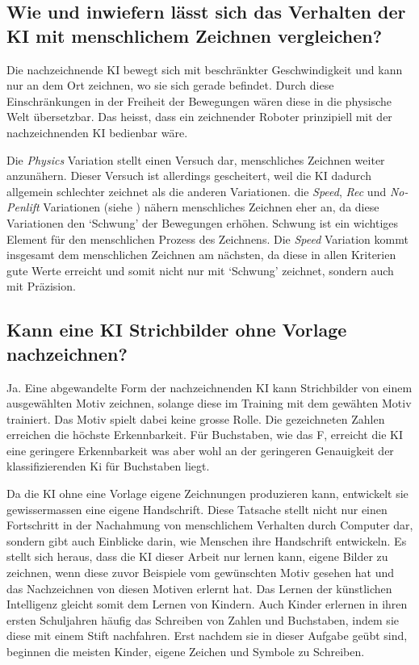   

\subsection{Wie und inwiefern lässt sich das Verhalten der KI mit menschlichem Zeichnen vergleichen?}\label{subsub:d_frage_unter_5}

Die nachzeichnende KI bewegt sich mit beschränkter Geschwindigkeit und kann nur
an dem Ort zeichnen, wo sie sich gerade befindet. Durch diese Einschränkungen in
der Freiheit der Bewegungen wären diese in die physische Welt übersetzbar.  Das
heisst, dass ein zeichnender Roboter prinzipiell mit der nachzeichnenden KI
bedienbar wäre.

Die \emph{Physics} Variation stellt einen Versuch dar, menschliches Zeichnen
weiter anzunähern. Dieser Versuch ist allerdings gescheitert, weil die KI
dadurch allgemein schlechter zeichnet als die anderen Variationen. die
\emph{Speed}, \emph{Rec} und \emph{No-Penlift} Variationen (siehe
) nähern menschliches Zeichnen eher an, da diese Variationen
den `Schwung' der Bewegungen erhöhen. Schwung ist ein wichtiges Element für den
menschlichen Prozess des Zeichnens. Die \emph{Speed} Variation kommt insgesamt
dem menschlichen Zeichnen am nächsten, da diese in allen Kriterien gute Werte
erreicht und somit nicht nur mit `Schwung' zeichnet, sondern auch mit Präzision.


\subsection{Kann eine KI Strichbilder ohne Vorlage
nachzeichnen?}\label{subsub:d_frage_unter_6} Ja. Eine abgewandelte Form der
nachzeichnenden KI kann Strichbilder von einem ausgewählten Motiv zeichnen,
solange diese im Training mit dem gewähten Motiv trainiert. Das Motiv spielt
dabei keine grosse Rolle. Die gezeichneten Zahlen erreichen die höchste
Erkennbarkeit. Für Buchstaben, wie das F, erreicht die KI eine geringere
Erkennbarkeit was aber wohl an der geringeren Genauigkeit der klassifizierenden
Ki für Buchstaben liegt.

Da die KI ohne eine Vorlage eigene Zeichnungen produzieren kann, entwickelt sie
gewissermassen eine eigene Handschrift. Diese Tatsache stellt nicht nur einen
Fortschritt in der Nachahmung von menschlichem Verhalten durch Computer dar,
sondern gibt auch Einblicke darin, wie Menschen ihre Handschrift entwickeln. Es
stellt sich heraus, dass die KI dieser Arbeit nur lernen kann, eigene Bilder zu
zeichnen, wenn diese zuvor Beispiele vom gewünschten Motiv gesehen hat und das
Nachzeichnen von diesen Motiven erlernt hat. Das Lernen der künstlichen
Intelligenz gleicht somit dem Lernen von Kindern. Auch Kinder erlernen in ihren
ersten Schuljahren häufig das Schreiben von Zahlen und Buchstaben, indem sie
diese mit einem Stift nachfahren. Erst nachdem sie in dieser Aufgabe geübt sind,
beginnen die meisten Kinder, eigene Zeichen und Symbole zu Schreiben.


